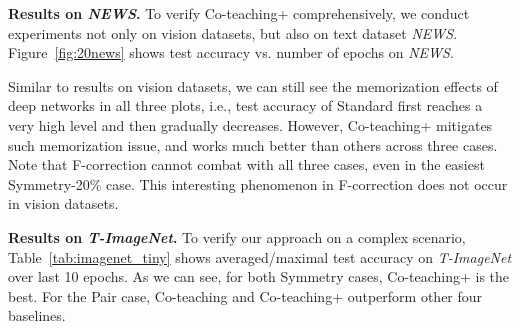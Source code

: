 \documentclass{article}
\begin{document}
\begin{figure*}[ht]
\centering{}
\caption{Test accuracy vs. number of epochs on \textit{CIFAR-100} dataset.
    }
\label{fig:cifar100}
\end{figure*}
\vspace{-5px}
\textbf{Results on \textit{NEWS}.}
To verify Co-teaching+ comprehensively, we conduct experiments not only on vision datasets, but also on text dataset \textit{NEWS}. Figure~\ref{fig:20news} shows
test accuracy vs. number of epochs on \textit{NEWS}.

Similar to results on vision datasets, we can still see the memorization effects of deep networks in all three plots, i.e., test accuracy of Standard first reaches a very high level and then gradually decreases. However, Co-teaching+ mitigates such memorization issue, and works much better than others across three cases. Note that F-correction cannot combat with all three cases, even in the easiest Symmetry-20\% case. This interesting phenomenon in F-correction does not occur in vision datasets.





\begin{figure*}[ht]
\centering{}
\caption{Test accuracy vs. number of epochs on \textit{NEWS} dataset.
    }
\label{fig:20news}
\end{figure*}

\textbf{Results on \textit{T-ImageNet}.}
To verify our approach on a complex scenario, Table~\ref{tab:imagenet_tiny} shows averaged/maximal test accuracy on \mbox{\textit{T-ImageNet}} over last 10 epochs. As we can see, for both Symmetry cases, Co-teaching+ is the best. For the Pair case, Co-teaching and Co-teaching+ outperform other four baselines.
\end{document}
